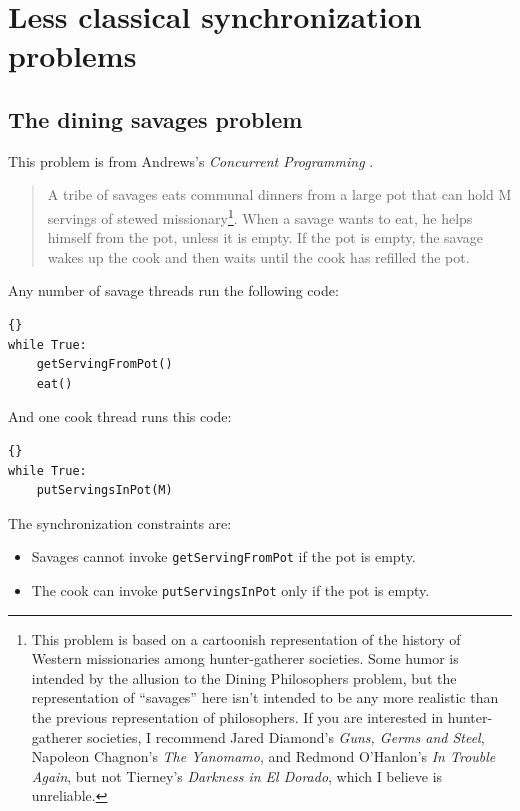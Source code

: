 \documentclass{book}
\newcommand{\clearemptydoublepage}{\newpage\cleardoublepage}
\begin{document}
\clearemptydoublepage
\chapter{Less classical synchronization problems}


\section{The dining savages problem}
\label{next}

This problem is from Andrews's 
{\em Concurrent Programming} \cite{andrews}.

\begin {quotation}
A tribe of savages eats communal dinners from a large pot that can
hold M servings of stewed missionary\footnote{This problem is based on
a cartoonish representation of the history of Western missionaries
among hunter-gatherer societies.  Some humor is intended by the
allusion to the Dining Philosophers problem, but the representation of
``savages'' here isn't intended to be any more realistic than the
previous representation of philosophers.  If you are interested in
hunter-gatherer societies, I recommend Jared Diamond's {\em Guns,
Germs and Steel}, Napoleon Chagnon's {\em The Yanomamo}, and Redmond
O'Hanlon's {\em In Trouble Again}, but not Tierney's {\em Darkness in
El Dorado}, which I believe is unreliable.}.  When a savage wants to
eat, he helps himself from the pot, unless it is empty.  If the pot is
empty, the savage wakes up the cook and then waits until the cook has
refilled the pot.
\end{quotation}

Any number of savage threads run the following code:

\begin{lstlisting}[title={Unsynchronized savage code}]{}
while True:
    getServingFromPot()
    eat()
\end{lstlisting}

And one cook thread runs this code:

\begin{lstlisting}[title={Unsynchronized cook code}]{}
while True:
    putServingsInPot(M)
\end{lstlisting}

The synchronization constraints are:

\begin{itemize}

\item Savages cannot invoke {\tt getServingFromPot} if the
pot is empty.

\item The cook can invoke {\tt putServingsInPot} only if
the pot is empty.

\end{itemize}
\end{document}
